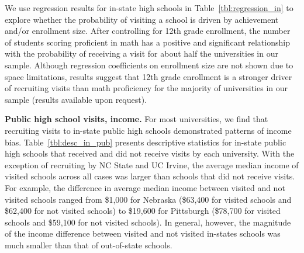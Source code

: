 \documentclass[twoside]{article}
\begin{document}
We use regression results for in-state high schools in Table~\ref{tbl:regression_in} to explore whether the probability of visiting a school is driven by achievement and/or enrollment size. After controlling for 12th grade enrollment, the number of students scoring proficient in math has a positive and significant relationship with the probability of receiving a visit for about half the universities in our sample. Although regression coefficients on enrollment size are not shown due to space limitations, results suggest that 12th grade enrollment is a stronger driver of recruiting visits than math proficiency for the majority of universities in our  sample (results available upon request).

\textbf{Public high school visits, income.} For most universities, we find that recruiting visits to in-state public high schools demonstrated patterns of income bias. Table~\ref{tbl:desc_in_pub} presents descriptive statistics for in-state public high schools that received and did not receive visits by each university.  With the exception of recruiting by NC State and UC Irvine, the average median income of visited schools across all cases was larger than schools that did not receive visits. For example, the difference in average median income between visited and not visited schools ranged from \$1,000 for Nebraska (\$63,400 for visited schools and \$62,400 for not visited schools) to \$19,600 for Pittsburgh (\$78,700 for visited schools and \$59,100 for not visited schools). In general, however, the magnitude of the income difference between visited and not visited in-states schools was much smaller than that of out-of-state schools.


\end{document}
